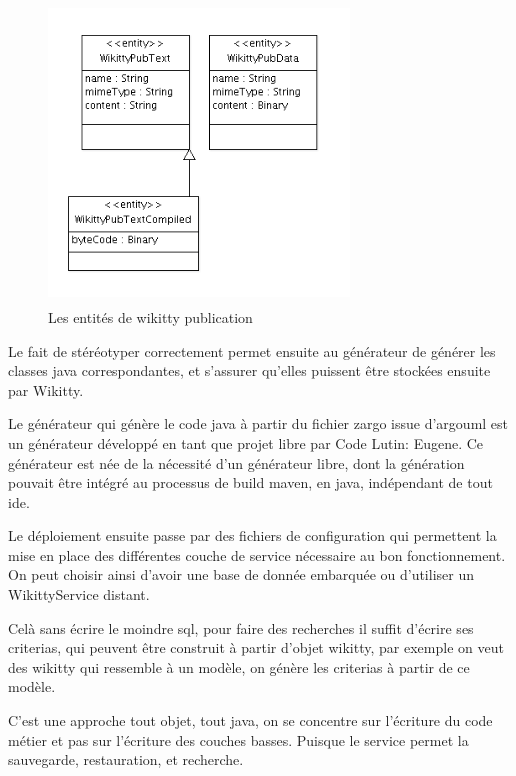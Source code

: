 \begin{figure}[!ht]
\centering
\includegraphics[height=8cm,width=8cm]{image/wikittypubuml.png}
  		\caption{Les entités de wikitty publication}
  		\label{umlwikittypub}
\end{figure}

Le fait de stéréotyper correctement permet ensuite au générateur de générer
les classes java correspondantes, et s'assurer qu'elles puissent être stockées
ensuite par Wikitty.

Le générateur qui génère le code java à partir du fichier zargo issue d'argouml
est un générateur développé en tant que projet libre par Code Lutin: Eugene.
Ce générateur est née de la nécessité d'un générateur libre, dont la génération
pouvait être intégré au processus de build maven, en java, indépendant de tout ide.

Le déploiement ensuite passe par des fichiers de configuration qui permettent la
mise en place des différentes couche de service nécessaire au bon fonctionnement.
On peut choisir ainsi d'avoir une base de donnée embarquée ou d'utiliser un
WikittyService distant.

Celà sans écrire le moindre sql, pour faire des recherches il suffit d'écrire
ses criterias, qui peuvent être construit à partir d'objet wikitty, par exemple 
on veut des wikitty qui ressemble à un modèle, on génère les criterias à partir
de ce modèle.

C'est une approche tout objet, tout java, on se concentre sur l'écriture du code
métier et pas sur l'écriture des couches basses. Puisque le service permet la
sauvegarde, restauration, et recherche. 

% 
% 


